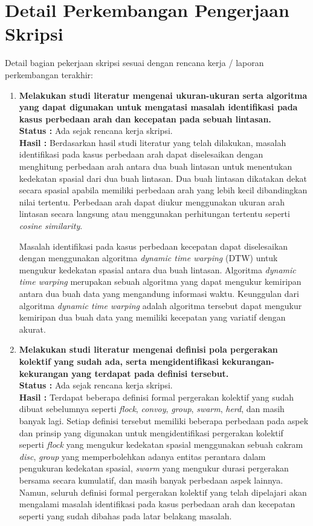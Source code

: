 \documentclass[a4paper,twoside]{article}
\begin{document}
\section{Detail Perkembangan Pengerjaan Skripsi}
Detail bagian pekerjaan skripsi sesuai dengan rencana kerja / laporan perkembangan terakhir:
	\begin{enumerate}
		\item \textbf{Melakukan studi literatur mengenai ukuran-ukuran serta algoritma yang dapat digunakan untuk mengatasi masalah identifikasi pada kasus perbedaan arah dan kecepatan pada sebuah lintasan.} \\
		{\bf Status :} Ada sejak rencana kerja skripsi.\\
		{\bf Hasil :} Berdasarkan hasil studi literatur yang telah dilakukan, masalah identifikasi pada kasus perbedaan arah dapat diselesaikan dengan menghitung perbedaan arah antara dua buah lintasan untuk menentukan kedekatan spasial dari dua buah lintasan. Dua buah lintasan dikatakan dekat secara spasial apabila memiliki perbedaan arah yang lebih kecil dibandingkan nilai tertentu. Perbedaan arah dapat diukur menggunakan ukuran arah lintasan secara langsung atau menggunakan perhitungan tertentu seperti \textit{cosine similarity}.
		
		Masalah identifikasi pada kasus perbedaan kecepatan dapat diselesaikan dengan menggunakan algoritma \textit{dynamic time warping} (DTW) untuk mengukur kedekatan spasial antara dua buah lintasan. Algoritma \textit{dynamic time warping} merupakan sebuah algoritma yang dapat mengukur kemiripan antara dua buah data yang mengandung informasi waktu. Keunggulan dari algoritma \textit{dynamic time warping} adalah algoritma tersebut dapat mengukur kemiripan dua buah data yang memiliki kecepatan yang variatif dengan akurat. \\
		
		\item \textbf{Melakukan studi literatur mengenai definisi pola pergerakan kolektif yang sudah ada, serta mengidentifikasi kekurangan-kekurangan yang terdapat pada definisi tersebut.}\\
		{\bf Status :} Ada sejak rencana kerja skripsi.\\
		{\bf Hasil :} Terdapat beberapa definisi formal pergerakan kolektif yang sudah dibuat sebelumnya seperti \textit{flock}, \textit{convoy}, \textit{group}, \textit{swarm}, \textit{herd}, dan masih banyak lagi. Setiap definisi tersebut memiliki beberapa perbedaan pada aspek dan prinsip yang digunakan untuk mengidentifikasi pergerakan kolektif seperti \textit{flock} yang mengukur kedekatan spasial menggunakan sebuah cakram \textit{disc}, \textit{group} yang memperbolehkan adanya entitas perantara dalam pengukuran kedekatan spasial, \textit{swarm} yang mengukur durasi pergerakan bersama secara kumulatif, dan masih banyak perbedaan aspek lainnya. Namun, seluruh definisi formal pergerakan kolektif yang telah dipelajari akan mengalami masalah identifikasi pada kasus perbedaan arah dan kecepatan seperti yang sudah dibahas pada latar belakang masalah. \\


\end{enumerate}
\end{document}
